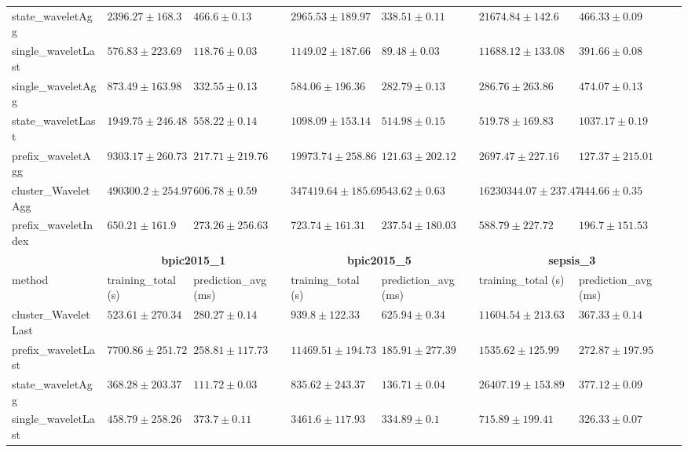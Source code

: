 \begin{table}[!htbp]
{\begin{tabular}{llllllll}
			state\_waveletAgg & $2396.27 \pm 168.3$ & $466.6 \pm 0.13$ & $2965.53 \pm 189.97$ & $338.51 \pm 0.11$ & $21674.84 \pm 142.6$ & $466.33 \pm 0.09$ \\ 
			single\_waveletLast & $576.83 \pm 223.69$ & $\mathbf{118.76 \pm 0.03}$ & $1149.02 \pm 187.66$ & $\mathbf{89.48 \pm 0.03}$ & $11688.12 \pm 133.08$ & $391.66 \pm 0.08$ \\ 
			single\_waveletAgg & $873.49 \pm 163.98$ & $332.55 \pm 0.13$ & $584.06 \pm 196.36$ & $282.79 \pm 0.13$ & $\mathbf{286.76 \pm 263.86}$ & $474.07 \pm 0.13$ \\ 
			state\_waveletLast & $1949.75 \pm 246.48$ & $558.22 \pm 0.14$ & $1098.09 \pm 153.14$ & $514.98 \pm 0.15$ & $519.78 \pm 169.83$ & $1037.17 \pm 0.19$ \\ 
			prefix\_waveletAgg & $9303.17 \pm 260.73$ & $217.71 \pm 219.76$ & $19973.74 \pm 258.86$ & $121.63 \pm 202.12$ & $2697.47 \pm 227.16$ & $\mathbf{127.37 \pm 215.01}$ \\ 
			cluster\_WaveletAgg & $490300.2 \pm 254.97$ & $606.78 \pm 0.59$ & $347419.64 \pm 185.69$ & $543.62 \pm 0.63$ & $16230344.07 \pm 237.47$ & $444.66 \pm 0.35$ \\ 
			prefix\_waveletIndex & $650.21 \pm 161.9$ & $273.26 \pm 256.63$ & $723.74 \pm 161.31$ & $237.54 \pm 180.03$ & $588.79 \pm 227.72$ & $196.7 \pm 151.53$ \\ 
			\bottomrule
			\toprule
			& \multicolumn{2}{c}{{\bfseries bpic2015\_1}} & \multicolumn{2}{c}{{\bfseries bpic2015\_5}} & \multicolumn{2}{c}{{\bfseries sepsis\_3}} \\ \cmidrule(lr){2-3} \cmidrule(lr){4-5} \cmidrule(lr){6-7}
			method  & training\_total (s) & prediction\_avg (ms) & training\_total (s) & prediction\_avg (ms) & training\_total (s) & prediction\_avg (ms) \\ \midrule
			cluster\_WaveletLast & $523.61 \pm 270.34$ & $280.27 \pm 0.14$ & $939.8 \pm 122.33$ & $625.94 \pm 0.34$ & $11604.54 \pm 213.63$ & $367.33 \pm 0.14$ \\ 
			prefix\_waveletLast & $7700.86 \pm 251.72$ & $258.81 \pm 117.73$ & $11469.51 \pm 194.73$ & $185.91 \pm 277.39$ & $1535.62 \pm 125.99$ & $272.87 \pm 197.95$ \\ 
			state\_waveletAgg & $\mathbf{368.28 \pm 203.37}$ & $111.72 \pm 0.03$ & $835.62 \pm 243.37$ & $136.71 \pm 0.04$ & $26407.19 \pm 153.89$ & $377.12 \pm 0.09$ \\ 
			single\_waveletLast & $458.79 \pm 258.26$ & $373.7 \pm 0.11$ & $3461.6 \pm 117.93$ & $334.89 \pm 0.1$ & $715.89 \pm 199.41$ & $326.33 \pm 0.07$ \\ 

\end{tabular}}
\end{table}

